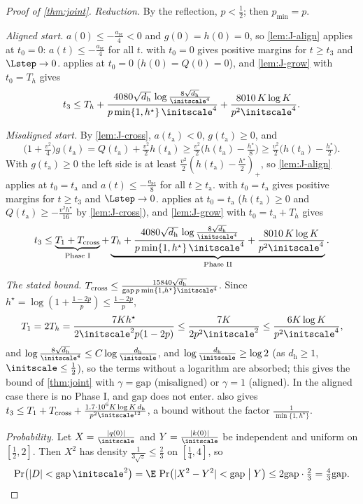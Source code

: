 \begin{proof}[Proof of \cref{thm:joint}]
\emph{Reduction.} By the reflection, $p<\frac{1}{2}$; then $p_{\min}=p$.

\emph{Aligned start.} $a(0)\le-\frac{a_{\mathrm{sc}}}{4}<0$ and $g(0)=h(0)=0$, so \cref{lem:J-align} applies at $t_0=0$: $a(t)\le-\frac{a_{\mathrm{sc}}}{4}$ for all $t$.
 with $t_0=0$ gives positive margins for $t\ge t_3$ and $\Lstep\to0$.  applies at $t_0=0$ ($h(0)=Q(0)=0$), and
\cref{lem:J-grow} with $t_0=T_h$ gives
\[
 t_3\le T_h+\frac{4080\sqrt{d_{\mathrm h}}\,\log\frac{8\sqrt{d_{\mathrm h}}}{\initscale^4}}{p\min\{1,h^\star\}\,\initscale^4}+\frac{8010\,K\log K}{p^2\initscale^4} .
\]

\emph{Misaligned start.} By \cref{lem:J-cross}, $a(t_{\mathrm a})<0$, $g(t_{\mathrm a})\ge0$, and
\[
 \bigl(1+\tfrac{v^2}{4}\bigr)g(t_{\mathrm a})=Q(t_{\mathrm a})+\tfrac{v^2}{2}h(t_{\mathrm a})\ge\tfrac{v^2}{2}\bigl(h(t_{\mathrm a})-\tfrac{h^\star}{8}\bigr)\ge\tfrac{v^2}{2}\bigl(h(t_{\mathrm a})-\tfrac{h^\star}{2}\bigr).
\]
With $g(t_{\mathrm a})\ge0$ the left side is at least $\frac{v^2}{2}(h(t_{\mathrm a})-\frac{h^\star}{2})_+$, so \cref{lem:J-align} applies at $t_0=t_{\mathrm a}$ and $a(t)\le-\frac{a_{\mathrm{sc}}}{8}$ for all $t\ge t_{\mathrm a}$.  with $t_0=t_{\mathrm a}$ gives positive margins for $t\ge t_3$ and $\Lstep\to0$. 
applies at $t_0=t_{\mathrm a}$ ($h(t_{\mathrm a})\ge0$ and $Q(t_{\mathrm a})\ge-\frac{v^2h^\star}{16}$ by \cref{lem:J-cross}), and \cref{lem:J-grow} with $t_0=t_{\mathrm a}+T_h$ gives
\[
 t_3\le\underbrace{T_1+T_{\mathrm{cross}}}_{\text{Phase I}}+\underbrace{T_h+\frac{4080\sqrt{d_{\mathrm h}}\,\log\frac{8\sqrt{d_{\mathrm h}}}{\initscale^4}}{p\min\{1,h^\star\}\,\initscale^4}+\frac{8010\,K\log K}{p^2\initscale^4}}_{\text{Phase II}} .
\]

\emph{The stated bound.} $T_{\mathrm{cross}}\le\frac{15840\sqrt{d_{\mathrm h}}}{\mathrm{gap}\,p\min\{1,h^\star\}\initscale^4}$. Since $h^\star=\log(1+\frac{1-2p}{p})\le\frac{1-2p}{p}$,
\[
 T_1=2T_h=\frac{7Kh^\star}{2\initscale^2p(1-2p)}\le\frac{7K}{2p^2\initscale^2}\le\frac{6K\log K}{p^2\initscale^4},
\]
and $\log\frac{8\sqrt{d_{\mathrm h}}}{\initscale^4}\le C\log\frac{d_{\mathrm h}}{\initscale}$, and $\log\frac{d_{\mathrm h}}{\initscale}\ge\log2$ (as $d_{\mathrm h}\ge1$, $\initscale\le\frac12$), so the terms without a logarithm are absorbed; this gives the bound of \cref{thm:joint} with $\gamma=\mathrm{gap}$ (misaligned) or $\gamma=1$ (aligned). In the
aligned case there is no Phase I, and $\mathrm{gap}$ does not enter.  also gives $t_3\le T_1+T_{\mathrm{cross}}+\frac{1.7\cdot10^6K\log K\,d_{\mathrm h}}{p^2\initscale^{12}}$, a bound
without the factor $\frac{1}{\min\{1,h^\star\}}$.

\emph{Probability.} Let $X=\frac{|q(0)|}{\initscale}$ and $Y=\frac{|k(0)|}{\initscale}$ be independent and uniform on $[\frac{1}{2},2]$. Then $X^2$ has density
$\frac{1}{3\sqrt z}\le\frac{2}{3}$ on $[\frac{1}{4},4]$, so
\[
 \Pr\bigl(|D|<\mathrm{gap}\,\initscale^2\bigr)=\E\,\Pr\bigl(|X^2-Y^2|<\mathrm{gap}\bigm|Y\bigr)\le2\mathrm{gap}\cdot\tfrac{2}{3}=\tfrac{4}{3}\mathrm{gap} .\qedhere
\]
\end{proof}

